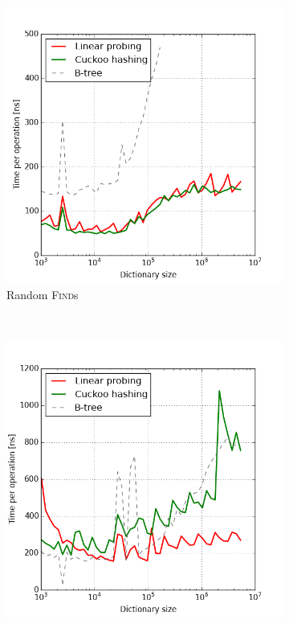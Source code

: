 \begin{figure}
\begin{subfigure}[b]{0.45\textwidth}
	\includegraphics[width=\textwidth]{img/performance/hashing-1}
	\caption{Random \textsc{Find}s}
\end{subfigure}
~
\begin{subfigure}[b]{0.45\textwidth}
	\includegraphics[width=\textwidth]{img/performance/hashing-2}

\end{subfigure}
\end{figure}
